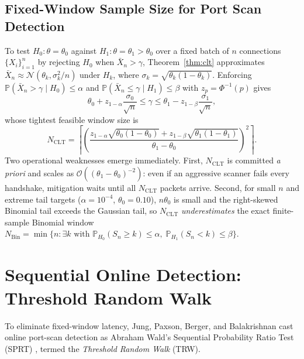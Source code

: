 \documentclass[oneside,noexaminfo,english]{sapthesis}
\numberwithin{equation}{section}
\numberwithin{figure}{section}
\numberwithin{table}{section}
\theoremstyle{compactplain}
\theoremstyle{compactdef}
\theoremstyle{compactrem}
\newcommand{\Prob}{\mathbb{P}}
\begin{document}
\subsection{Fixed-Window Sample Size for Port Scan Detection}
To test $H_0: \theta = \theta_0$ against $H_1: \theta = \theta_1 > \theta_0$ over a fixed batch of $n$ connections $\{X_i\}_{i=1}^n$ by rejecting $H_0$ when $\bar{X}_n > \gamma$, Theorem~\ref{thm:clt} approximates $\bar{X}_n \approx \mathcal{N}(\theta_k, \sigma_k^2/n)$ under $H_k$, where $\sigma_k = \sqrt{\theta_k(1-\theta_k)}$. Enforcing $\Prob(\bar{X}_n > \gamma \mid H_0) \le \alpha$ and $\Prob(\bar{X}_n \le \gamma \mid H_1) \le \beta$ with $z_p = \Phi^{-1}(p)$ gives
\begin{equation}
    \label{eq:clt_thresholds}
    \theta_0 + z_{1-\alpha}\frac{\sigma_0}{\sqrt{n}} \le \gamma \le \theta_1 - z_{1-\beta}\frac{\sigma_1}{\sqrt{n}},
\end{equation}
whose tightest feasible window size is
\begin{equation}
    \label{eq:n_clt}
    N_{\mathrm{CLT}} = \left\lceil \left( \frac{z_{1-\alpha}\sqrt{\theta_0(1-\theta_0)} + z_{1-\beta}\sqrt{\theta_1(1-\theta_1)}}{\theta_1 - \theta_0} \right)^2 \right\rceil.
\end{equation}
Two operational weaknesses emerge immediately. First, $N_{\mathrm{CLT}}$ is committed \emph{a priori} and scales as $\mathcal{O}((\theta_1 - \theta_0)^{-2})$: even if an aggressive scanner fails every handshake, mitigation waits until all $N_{\mathrm{CLT}}$ packets arrive. Second, for small $n$ and extreme tail targets ($\alpha = 10^{-4}$, $\theta_0 = 0.10$), $n\theta_0$ is small and the right-skewed Binomial tail exceeds the Gaussian tail, so $N_{\mathrm{CLT}}$ \emph{underestimates} the exact finite-sample Binomial window $N_{\mathrm{Bin}} = \min\{n : \exists k \text{ with } \Prob_{H_0}(S_n \ge k) \le \alpha,\; \Prob_{H_1}(S_n < k) \le \beta\}$.

\section{Sequential Online Detection: Threshold Random Walk}
\label{sec:trw}

To eliminate fixed-window latency, Jung, Paxson, Berger, and Balakrishnan \cite{jung2004} cast online port-scan detection as Abraham Wald's Sequential Probability Ratio Test (SPRT) \cite{wald1945}, termed the \emph{Threshold Random Walk} (TRW).
\end{document}
